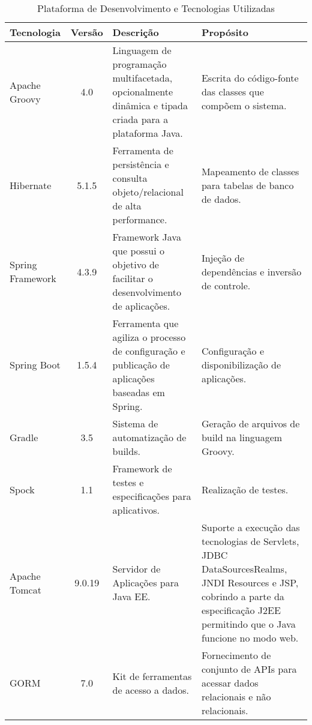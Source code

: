 \begin{table}[h]
	\centering	
	\vspace{0.5cm}
	\footnotesize
	\caption{Plataforma de Desenvolvimento e Tecnologias Utilizadas}	
	\label{tabela-plataforma}
	\begin{tabular}{|p{1.6cm}|c|p{5cm}|p{6.5cm}|}  \hline 
 		
 		\rowcolor[rgb]{0.8,0.8,0.8} Tecnologia & Versão & Descrição & Propósito \\\hline 

		Apache Groovy & 4.0 & Linguagem de programação multifacetada, opcionalmente dinâmica e tipada criada para a plataforma Java. & Escrita do código-fonte das classes que compõem o sistema. \\\hline

		Hibernate & 5.1.5 & Ferramenta de persistência e consulta objeto/relacional de alta performance. & Mapeamento de classes para tabelas de banco de dados. \\\hline 		
		
		Spring Framework & 4.3.9 & Framework Java que possui o objetivo de facilitar o desenvolvimento de aplicações. & Injeção de dependências e inversão de controle. \\\hline
		
		Spring Boot & 1.5.4 & Ferramenta que agiliza o processo de configuração e publicação de aplicações baseadas em Spring. & Configuração e disponibilização de aplicações. \\\hline
		
		Gradle & 3.5 & Sistema de automatização de builds. & Geração de arquivos de build na linguagem Groovy. \\\hline
		
		Spock & 1.1 & Framework de testes e especificações para aplicativos. & Realização de testes. \\\hline 
	
		Apache Tomcat & 9.0.19 & Servidor de Aplicações para Java EE. & Suporte a execução das tecnologias de Servlets, JDBC DataSourcesRealms, JNDI Resources e JSP, cobrindo a parte da especificação J2EE permitindo que o Java funcione no modo web. \\\hline
		
		GORM & 7.0 & Kit de ferramentas de acesso a dados. & Fornecimento de conjunto de APIs para acessar dados relacionais e não relacionais. \\\hline
		
	\end{tabular}
\end{table}







